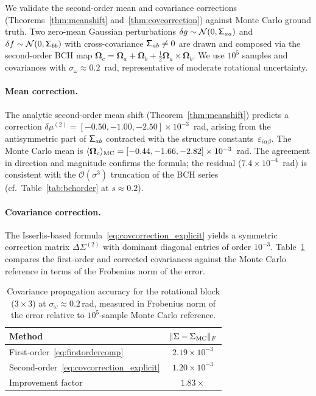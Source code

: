\documentclass[journal]{IEEEtran}
\newcommand{\bfOmega}{\boldsymbol{\Omega}}
\newcommand{\sfSigma}[1]{\mathsf{\Sigma}_\mathnormal{#1}}
\begin{document}
We validate the second-order mean and covariance corrections
(Theorems~\ref{thm:meanshift} and~\ref{thm:covcorrection})
against Monte Carlo ground truth.
Two zero-mean Gaussian perturbations
$\delta g \sim \mathcal{N}(0, \sfSigma{aa})$ and
$\delta f \sim \mathcal{N}(0, \sfSigma{bb})$
with cross-covariance $\sfSigma{ab} \neq 0$ are drawn
and composed via the second-order BCH map
$\bfOmega_c = \bfOmega_a + \bfOmega_b
+ \tfrac{1}{2}\bfOmega_a \times \bfOmega_b$.
We use $10^5$ samples and covariances with
$\sigma_\omega \approx 0.2$~rad, representative of
moderate rotational uncertainty.

\paragraph{Mean correction.}
The analytic second-order mean shift (Theorem~\ref{thm:meanshift})
predicts a correction
$\delta\mu^{(2)} = [-0.50, -1.00, -2.50] \times 10^{-3}$~rad,
arising from the antisymmetric part of $\sfSigma{ab}$
contracted with the structure constants~$\varepsilon_{i\alpha\beta}$.
The Monte Carlo mean is
$\langle \bfOmega_c \rangle_{\rm MC}
= [-0.44, -1.66, -2.82] \times 10^{-3}$~rad.
The agreement in direction and magnitude confirms
the formula; the residual ($7.4\times 10^{-4}$~rad)
is consistent with the $\mathcal{O}(\sigma^3)$ truncation
of the BCH series (cf.\ Table~\ref{tab:bchorder}
at $s \approx 0.2$).

\paragraph{Covariance correction.}
The Isserlis-based formula~\eqref{eq:covcorrection_explicit}
yields a symmetric correction matrix
$\Delta\Sigma^{(2)}$ with dominant diagonal entries
of order $10^{-3}$.
Table~\ref{tab:covmc} compares the first-order and
corrected covariances against the Monte Carlo reference
in terms of the Frobenius norm of the error.

\begin{table}[t]
\centering
\caption{Covariance propagation accuracy for the rotational
block ($3\times 3$) at $\sigma_\omega \approx 0.2$\,rad,
measured in Frobenius norm of the error relative to
$10^5$-sample Monte Carlo reference.}
\label{tab:covmc}
\begin{tabular}{l|c}
Method & $\|\Sigma - \Sigma_{\rm MC}\|_F$ \\
\hline
First-order~\eqref{eq:firstordercomp} & $2.19 \times 10^{-3}$ \\
Second-order~\eqref{eq:covcorrection_explicit} & $1.20 \times 10^{-3}$ \\
\hline
Improvement factor & $1.83\times$
\end{tabular}
\end{table}
\end{document}
